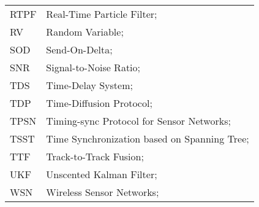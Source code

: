 \begin{longtable}{ll}
	RTPF		& Real-Time Particle Filter; \\
	RV			& Random Variable; \\
	SOD			& Send-On-Delta; \\
	SNR			& Signal-to-Noise Ratio; \\
	TDS			& Time-Delay System; \\
	TDP			& Time-Diffusion Protocol; \\
	TPSN		& Timing-sync Protocol for Sensor Networks; \\
	TSST		& Time Synchronization based on Spanning Tree; \\
	TTF 		& Track-to-Track Fusion; \\
	UKF			& Unscented Kalman Filter; \\
	WSN			& Wireless Sensor Networks; \\
\end{longtable}

